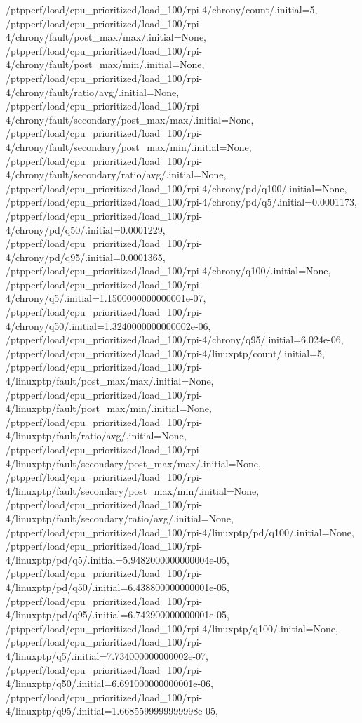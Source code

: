 {    /ptpperf/load/cpu_prioritized/load_100/rpi-4/chrony/count/.initial=5,
    /ptpperf/load/cpu_prioritized/load_100/rpi-4/chrony/fault/post_max/max/.initial=None,
    /ptpperf/load/cpu_prioritized/load_100/rpi-4/chrony/fault/post_max/min/.initial=None,
    /ptpperf/load/cpu_prioritized/load_100/rpi-4/chrony/fault/ratio/avg/.initial=None,
    /ptpperf/load/cpu_prioritized/load_100/rpi-4/chrony/fault/secondary/post_max/max/.initial=None,
    /ptpperf/load/cpu_prioritized/load_100/rpi-4/chrony/fault/secondary/post_max/min/.initial=None,
    /ptpperf/load/cpu_prioritized/load_100/rpi-4/chrony/fault/secondary/ratio/avg/.initial=None,
    /ptpperf/load/cpu_prioritized/load_100/rpi-4/chrony/pd/q100/.initial=None,
    /ptpperf/load/cpu_prioritized/load_100/rpi-4/chrony/pd/q5/.initial=0.0001173,
    /ptpperf/load/cpu_prioritized/load_100/rpi-4/chrony/pd/q50/.initial=0.0001229,
    /ptpperf/load/cpu_prioritized/load_100/rpi-4/chrony/pd/q95/.initial=0.0001365,
    /ptpperf/load/cpu_prioritized/load_100/rpi-4/chrony/q100/.initial=None,
    /ptpperf/load/cpu_prioritized/load_100/rpi-4/chrony/q5/.initial=1.1500000000000001e-07,
    /ptpperf/load/cpu_prioritized/load_100/rpi-4/chrony/q50/.initial=1.3240000000000002e-06,
    /ptpperf/load/cpu_prioritized/load_100/rpi-4/chrony/q95/.initial=6.024e-06,
    /ptpperf/load/cpu_prioritized/load_100/rpi-4/linuxptp/count/.initial=5,
    /ptpperf/load/cpu_prioritized/load_100/rpi-4/linuxptp/fault/post_max/max/.initial=None,
    /ptpperf/load/cpu_prioritized/load_100/rpi-4/linuxptp/fault/post_max/min/.initial=None,
    /ptpperf/load/cpu_prioritized/load_100/rpi-4/linuxptp/fault/ratio/avg/.initial=None,
    /ptpperf/load/cpu_prioritized/load_100/rpi-4/linuxptp/fault/secondary/post_max/max/.initial=None,
    /ptpperf/load/cpu_prioritized/load_100/rpi-4/linuxptp/fault/secondary/post_max/min/.initial=None,
    /ptpperf/load/cpu_prioritized/load_100/rpi-4/linuxptp/fault/secondary/ratio/avg/.initial=None,
    /ptpperf/load/cpu_prioritized/load_100/rpi-4/linuxptp/pd/q100/.initial=None,
    /ptpperf/load/cpu_prioritized/load_100/rpi-4/linuxptp/pd/q5/.initial=5.9482000000000004e-05,
    /ptpperf/load/cpu_prioritized/load_100/rpi-4/linuxptp/pd/q50/.initial=6.438800000000001e-05,
    /ptpperf/load/cpu_prioritized/load_100/rpi-4/linuxptp/pd/q95/.initial=6.742900000000001e-05,
    /ptpperf/load/cpu_prioritized/load_100/rpi-4/linuxptp/q100/.initial=None,
    /ptpperf/load/cpu_prioritized/load_100/rpi-4/linuxptp/q5/.initial=7.734000000000002e-07,
    /ptpperf/load/cpu_prioritized/load_100/rpi-4/linuxptp/q50/.initial=6.691000000000001e-06,
    /ptpperf/load/cpu_prioritized/load_100/rpi-4/linuxptp/q95/.initial=1.6685599999999998e-05,
}
